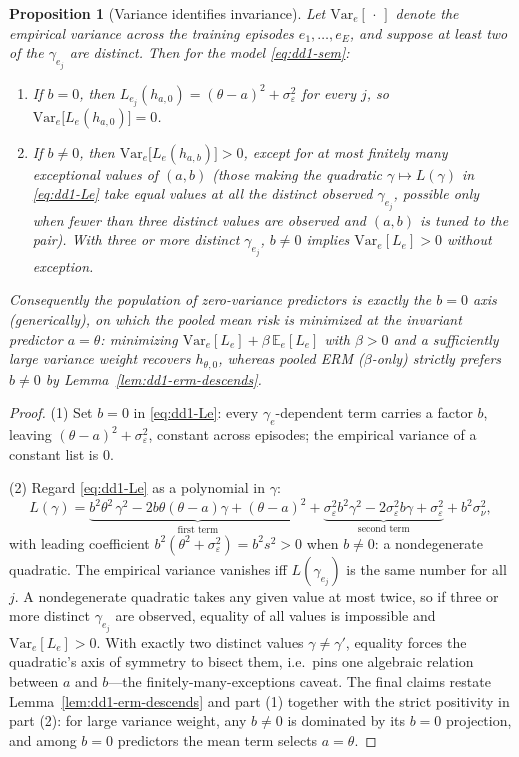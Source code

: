 \documentclass[11pt,a4paper]{article}
\theoremstyle{definition}
\theoremstyle{plain}
\newtheorem{proposition}{Proposition}[section]
\newcommand{\E}{\mathbb{E}}
\newcommand{\Var}{\mathrm{Var}}
\begin{document}
\begin{proposition}[Variance identifies invariance]
\label{prop:dd1-variance-detects}
Let $\Var_e[\,\cdot\,]$ denote the empirical variance across the training
episodes $e_1, \dots, e_E$, and suppose at least two of the
$\gamma_{e_j}$ are distinct. Then for the model
\eqref{eq:dd1-sem}:
\begin{enumerate}
\item If $b = 0$, then $L_{e_j}(h_{a, 0}) = (\theta - a)^2 +
\sigma_\varepsilon^2$ for every $j$, so $\Var_e\bigl[ L_e(h_{a,0}) \bigr] =
0$.
\item If $b \neq 0$, then $\Var_e\bigl[ L_e(h_{a,b}) \bigr] > 0$, except for
at most finitely many exceptional values of $(a, b)$ (those making the
quadratic $\gamma \mapsto L(\gamma)$ in \eqref{eq:dd1-Le} take equal values
at all the distinct observed $\gamma_{e_j}$, possible only when fewer than
three distinct values are observed and $(a,b)$ is tuned to the pair).
With three or more distinct $\gamma_{e_j}$, $b \neq 0$ implies
$\Var_e[L_e] > 0$ without exception.
\end{enumerate}
Consequently the population of zero-variance predictors is exactly the
$b = 0$ axis (generically), on which the pooled mean risk is minimized at
the invariant predictor $a = \theta$: minimizing
$\Var_e[L_e] + \beta\, \E_e[L_e]$ with $\beta > 0$ and a sufficiently large
variance weight recovers $h_{\theta, 0}$, whereas pooled ERM
($\beta$-only) strictly prefers $\widehat b \neq 0$ by
Lemma~\ref{lem:dd1-erm-descends}.
\end{proposition}

\begin{proof}
(1) Set $b = 0$ in \eqref{eq:dd1-Le}: every $\gamma_e$-dependent term carries
a factor $b$, leaving $(\theta - a)^2 + \sigma_\varepsilon^2$, constant
across episodes; the empirical variance of a constant list is $0$.

(2) Regard \eqref{eq:dd1-Le} as a polynomial in $\gamma$:
\[
L(\gamma) = \underbrace{b^2\theta^2 \,\gamma^2 - 2b\theta(\theta - a)\gamma
+ (\theta - a)^2}_{\text{first term}}
+ \underbrace{\sigma_\varepsilon^2 b^2 \gamma^2 - 2\sigma_\varepsilon^2 b
\gamma + \sigma_\varepsilon^2}_{\text{second term}} + b^2\sigma_\nu^2,
\]
with leading coefficient $b^2(\theta^2 + \sigma_\varepsilon^2) = b^2 s^2 > 0$
when $b \neq 0$: a nondegenerate quadratic. The empirical variance vanishes
iff $L(\gamma_{e_j})$ is the same number for all $j$. A nondegenerate
quadratic takes any given value at most twice, so if three or more distinct
$\gamma_{e_j}$ are observed, equality of all values is impossible and
$\Var_e[L_e] > 0$. With exactly two distinct values $\gamma \neq \gamma'$,
equality forces the quadratic's axis of symmetry to bisect them, i.e.\ pins
one algebraic relation between $a$ and $b$---the finitely-many-exceptions
caveat. The final claims restate Lemma~\ref{lem:dd1-erm-descends} and part
(1) together with the strict positivity in part (2): for large variance
weight, any $b \neq 0$ is dominated by its $b = 0$ projection, and among
$b = 0$ predictors the mean term selects $a = \theta$.
\end{proof}
\end{document}
